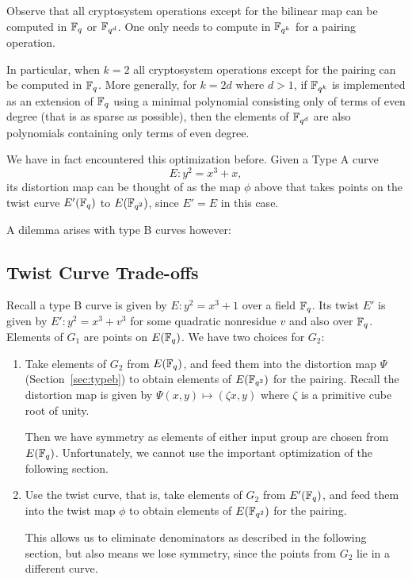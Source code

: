 Observe that all cryptosystem operations except for the bilinear map
can be computed in $\mathbb{F}_q$ or $\mathbb{F}_{q^d}$.
One only needs to compute in $\mathbb{F}_{q^k}$ for a pairing operation.

In particular,
when $k=2$ all cryptosystem operations except for the pairing
can be computed in $\mathbb{F}_q$.
More generally, for $k=2d$ where $d > 1$,
if $\mathbb{F}_{q^k}$ is implemented as an extension of $\mathbb{F}_q$ using
a minimal polynomial consisting only of terms of even degree (that is as
sparse as possible),
then the elements of $\mathbb{F}_{q^d}$ are also polynomials containing only terms
of even degree.

We have in fact encountered this optimization before.
Given a Type A curve
\[E : y^2 = x^3 + x ,\]
its distortion map can be thought of as the
map $\phi$ above that takes points on the twist curve $E'(\mathbb{F}_q)$
to $E(\mathbb{F}_{q^2})$, since $E' = E$ in this case.

A dilemma arises with type B curves however:

\subsection {\label{sec:twistcurvetradeoffs}Twist Curve Trade-offs}

Recall a type B curve is given by
$E : y^2 = x^3 + 1$
over a field $\mathbb{F}_q$.
Its twist $E'$ is given by
$E' : y^2 = x^3 + v^3$
for some quadratic nonresidue $v$ and also over $\mathbb{F}_q$.
Elements of $G_1$ are points on $E(\mathbb{F}_q)$. We have two choices for
$G_2$:

\begin{enumerate}
\item
Take elements of $G_2$ from $E(\mathbb{F}_q)$, and
feed them into the distortion map $\Psi$ (Section~\ref{sec:typeb})
to obtain elements of $E(\mathbb{F}_{q^2})$ for the pairing.
Recall the distortion map is given by $\Psi(x,y) \mapsto (\zeta x , y)$
where $\zeta$ is a primitive cube root of unity.

Then we have symmetry as elements of either input group are chosen
from $E(\mathbb{F}_q)$.
Unfortunately, we cannot use the important optimization of the following
section.

\item
Use the twist curve, that is, take elements of $G_2$ from $E'(\mathbb{F}_q)$, and
feed them into the twist map $\phi$ to obtain elements of $E(\mathbb{F}_{q^2})$
for the pairing.

This allows us to eliminate denominators as described in the following
section, but also means we lose symmetry, since the points from $G_2$
lie in a different curve.
\end{enumerate}


